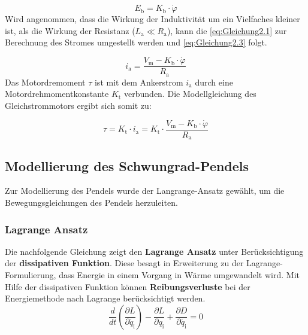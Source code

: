 \begin{equation} \label{eq:Gleichung2.2}
    E_{\mathrm{b}} = K_{\mathrm{b}} \cdot \dot\varphi
\end{equation}
\newline
Wird angenommen, dass die Wirkung der Induktivität um ein Vielfaches kleiner ist, als die Wirkung der Resistanz ($L_{\mathrm{a}} \ll R_{\mathrm{a}}$), kann die \autoref{eq:Gleichung2.1} zur Berechnung des Stromes umgestellt werden und \autoref{eq:Gleichung2.3} folgt.

\begin{equation} \label{eq:Gleichung2.3}
    i_{\mathrm{a}} = \frac{V_{\mathrm{m}} - K_{\mathrm{b}} \cdot \dot\varphi}{R_{\mathrm{a}}}
\end{equation}
\newline
Das Motordremoment $\tau$ ist mit dem Ankerstrom $i_{\mathrm{a}}$ durch eine Motordrehmomentkonstante $K_{\mathrm{t}}$ verbunden. Die Modellgleichung des Gleichstrommotors ergibt sich somit zu:

\begin{equation} \label{eq:Gleichung2.4}
    \boxed{\tau = K_{\mathrm{t}} \cdot i_{\mathrm{a}} = K_{\mathrm{t}} \cdot \frac{V_{\mathrm{m}} - K_{\mathrm{b}} \cdot \dot\varphi}{R_{\mathrm{a}}}}
\end{equation}

\subsection{Modellierung des Schwungrad-Pendels}

Zur Modellierung des Pendels wurde der Langrange-Ansatz gewählt, um die Bewegungsgleichungen des Pendels herzuleiten.
 
\subsubsection{Lagrange Ansatz}

Die nachfolgende Gleichung zeigt den \textbf{Lagrange Ansatz} unter Berücksichtigung der \textbf{dissipativen Funktion}. Diese besagt in Erweiterung zu der Lagrange-Formulierung, dass Energie in einem Vorgang in Wärme umgewandelt wird. Mit Hilfe der dissipativen Funktion können \textbf{Reibungsverluste} bei der Energiemethode nach Lagrange berücksichtigt werden.
\begin{equation} \label{eq:Gleichung2.5}
    \boxed{\frac{d}{dt} \left(\frac{\partial L}{\partial \dot{q_{\mathrm{i}}}}\right) - \frac{\partial L}{\partial q_{\mathrm{i}}} + \frac{\partial D}{\partial \dot{q_{\mathrm{i}}}} = 0}
\end{equation}

